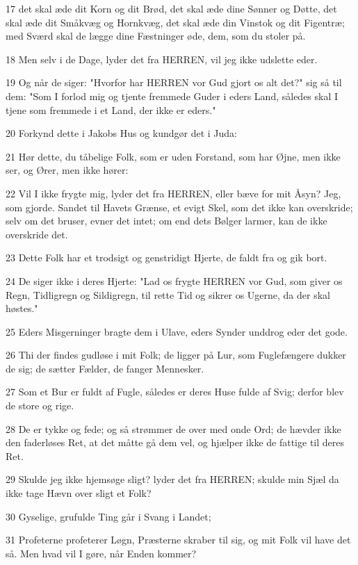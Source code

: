 \par 17 det skal æde dit Korn og dit Brød, det skal æde dine Sønner og Døtte, det skal æde dit Småkvæg og Hornkvæg, det skal æde din Vinstok og dit Figentræ; med Sværd skal de lægge dine Fæstninger øde, dem, som du stoler på.
\par 18 Men selv i de Dage, lyder det fra HERREN, vil jeg ikke udslette eder.
\par 19 Og når de siger: "Hvorfor har HERREN vor Gud gjort os alt det?" sig så til dem: "Som I forlod mig og tjente fremmede Guder i eders Land, således skal I tjene som fremmede i et Land, der ikke er eders."
\par 20 Forkynd dette i Jakobs Hus og kundgør det i Juda:
\par 21 Hør dette, du tåbelige Folk, som er uden Forstand, som har Øjne, men ikke ser, og Ører, men ikke hører:
\par 22 Vil I ikke frygte mig, lyder det fra HERREN, eller bæve for mit Åsyn? Jeg, som gjorde. Sandet til Havets Grænse, et evigt Skel, som det ikke kan overskride; selv om det bruser, evner det intet; om end dets Bølger larmer, kan de ikke overskride det.
\par 23 Dette Folk har et trodsigt og genstridigt Hjerte, de faldt fra og gik bort.
\par 24 De siger ikke i deres Hjerte: "Lad os frygte HERREN vor Gud, som giver os Regn, Tidligregn og Sildigregn, til rette Tid og sikrer os Ugerne, da der skal høstes."
\par 25 Eders Misgerninger bragte dem i Ulave, eders Synder unddrog eder det gode.
\par 26 Thi der findes gudløse i mit Folk; de ligger på Lur, som Fuglefængere dukker de sig; de sætter Fælder, de fanger Mennesker.
\par 27 Som et Bur er fuldt af Fugle, således er deres Huse fulde af Svig; derfor blev de store og rige.
\par 28 De er tykke og fede; og så strømmer de over med onde Ord; de hævder ikke den faderløses Ret, at det måtte gå dem vel, og hjælper ikke de fattige til deres Ret.
\par 29 Skulde jeg ikke hjemsøge sligt? lyder det fra HERREN; skulde min Sjæl da ikke tage Hævn over sligt et Folk?
\par 30 Gyselige, grufulde Ting går i Svang i Landet;
\par 31 Profeterne profeterer Løgn, Præsterne skraber til sig, og mit Folk vil have det så. Men hvad vil I gøre, når Enden kommer?

